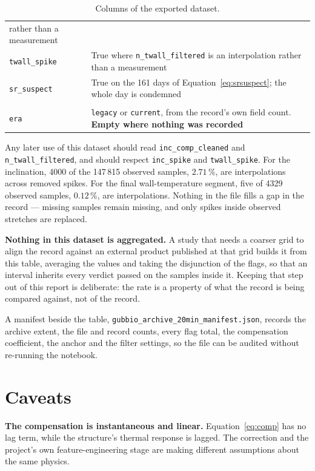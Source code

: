 \documentclass[11pt,a4paper]{article}
\begin{document}
\begin{table}[H]
\begin{tabularx}{\textwidth}{L{5.2cm}Y}
rather than a measurement \\
\texttt{twall\_spike} & True where \texttt{n\_twall\_filtered} is an interpolation
rather than a measurement \\
\texttt{sr\_suspect} & True on the 161 days of Equation~\eqref{eq:srsuspect};
the whole day is condemned \\
\addlinespace
{} \\
\texttt{era} & \texttt{legacy} or \texttt{current}, from the record's own field
count. \textbf{Empty where nothing was recorded} \\
\bottomrule
\end{tabularx}
\caption{Columns of the exported dataset.}
\label{tab:dataset}
\end{table}

Any later use of this dataset should read \texttt{inc\_comp\_cleaned} and \texttt{n\_twall\_filtered}, and should respect \texttt{inc\_spike} and \texttt{twall\_spike}. For the inclination, 4000 of the 147\,815 observed samples, $2.71$\,\%, are interpolations across removed spikes. For the final wall-temperature segment, five of 4329 observed samples, $0.12$\,\%, are interpolations. Nothing in the file fills a gap in the record --- missing samples remain missing, and only spikes inside observed stretches are replaced.

\textbf{Nothing in this dataset is aggregated.} A study that needs a coarser grid to align the record against an external product published at that grid builds it from this table, averaging the values and taking the disjunction of the flags, so that an interval inherits every verdict passed on the samples inside it. Keeping that step out of this report is deliberate: the rate is a property of what the record is being compared against, not of the record.

A manifest beside the table, \texttt{gubbio\_archive\_20min\_manifest.json}, records the archive extent, the file and record counts, every flag total, the compensation coefficient, the anchor and the filter settings, so the file can be audited without re-running the notebook.

\section{Caveats}

\textbf{The compensation is instantaneous and linear.} Equation~\eqref{eq:comp} has no lag term, while the structure's thermal response is lagged. The correction and the project's own feature-engineering stage are making different assumptions about the same physics.
\end{document}
